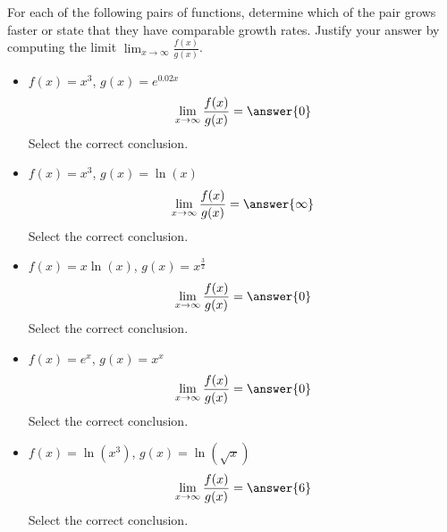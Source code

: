 \documentclass{ximera}
\author{Nela Lakos \and Kyle Parsons}
\begin{document}
\begin{exercise}

For each of the following pairs of functions, determine which of the pair grows faster or state that they have comparable growth rates.  Justify your answer by computing the limit $\lim_{x\to\infty}\frac{f(x)}{g(x)}$.

\begin{itemize}

\item $f(x)=x^3$, $g(x)=e^{0.02x}$
\[
\lim_{x\to\infty}\frac{f(x)}{g(x)} = \answer{0}
\]
Select the correct conclusion.
\begin{multipleChoice}
\end{multipleChoice}

\item $f(x)=x^3$, $g(x)=\ln(x)$
\[
\lim_{x\to\infty}\frac{f(x)}{g(x)} = \answer{\infty}
\]
Select the correct conclusion.
\begin{multipleChoice}
\end{multipleChoice}

\item $f(x)=x\ln(x)$, $g(x)=x^{\frac{3}{2}}$
\[
\lim_{x\to\infty}\frac{f(x)}{g(x)} = \answer{0}
\]
Select the correct conclusion.
\begin{multipleChoice}
\end{multipleChoice}

\item $f(x)=e^x$, $g(x)=x^x$
\[
\lim_{x\to\infty}\frac{f(x)}{g(x)} = \answer{0}
\]
Select the correct conclusion.
\begin{multipleChoice}
\end{multipleChoice}

\item $f(x)=\ln(x^3)$, $g(x)=\ln(\sqrt{x})$
\[
\lim_{x\to\infty}\frac{f(x)}{g(x)} = \answer{6}
\]
Select the correct conclusion.
\begin{multipleChoice}
\end{multipleChoice}

\end{itemize}

\end{exercise}
\end{document}
